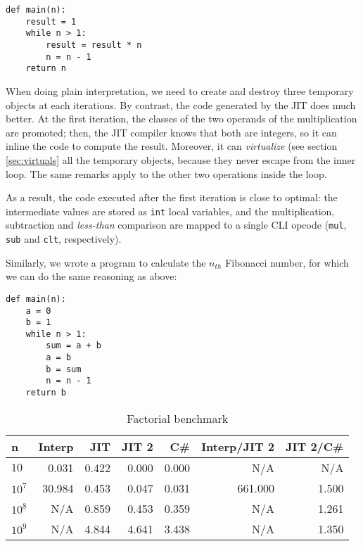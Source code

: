 
\begin{lstlisting}
def main(n):
    result = 1
    while n > 1:
        result = result * n
        n = n - 1
    return n
\end{lstlisting}

When doing plain interpretation, we need to create and destroy three temporary
objects at each iterations.  By contrast, the code generated by the JIT does
much better.  At the first iteration, the classes of the two operands of the
multiplication are promoted; then, the JIT compiler knows that both are
integers, so it can inline the code to compute the result.  Moreover, it can
\emph{virtualize} (see section \ref{sec:virtuals} all the temporary objects, because they never escape from
the inner loop.  The same remarks apply to the other two operations inside
the loop.

As a result, the code executed after the first iteration is close to optimal:
the intermediate values are stored as \lstinline{int} local variables, and the
multiplication, subtraction and \emph{less-than} comparison are mapped to a
single CLI opcode (\lstinline{mul}, \lstinline{sub} and \lstinline{clt},
respectively).

Similarly, we wrote a program to calculate the $n_{th}$ Fibonacci number, for
which we can do the same reasoning as above:

\begin{lstlisting}
def main(n):
    a = 0
    b = 1
    while n > 1:
        sum = a + b
        a = b
        b = sum
        n = n - 1
    return b
\end{lstlisting}


\begin{table}[ht]
  \begin{tabular}{|l|r|r|r|r||r|r|}
    \hline
    \textbf{n} & 
    \textbf{Interp} &
    \textbf{JIT} &
    \textbf{JIT 2} &
    \textbf{C\#} &
    \textbf{Interp/JIT 2} &
    \textbf{JIT 2/C\#} \\
    \hline

    $10$    &   0.031  &  0.422  &  0.000  &  0.000  &      N/A  &    N/A \\
    $10^7$  &  30.984  &  0.453  &  0.047  &  0.031  &  661.000  &  1.500 \\
    $10^8$  &     N/A  &  0.859  &  0.453  &  0.359  &      N/A  &  1.261 \\
    $10^9$  &     N/A  &  4.844  &  4.641  &  3.438  &      N/A  &  1.350 \\

    \hline

  \end{tabular}
  \caption{Factorial benchmark}
  \label{tab:factorial}
\end{table}


